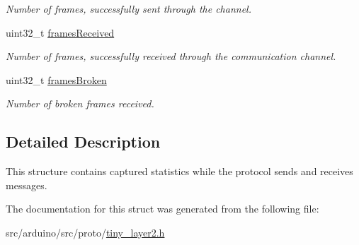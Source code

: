 \begin{DoxyCompactItemize}
\begin{DoxyCompactList}\small\item\em Number of frames, successfully sent through the channel. \end{DoxyCompactList}\item 
\hypertarget{structSTinyStats_a19dfd3a62dbb9d86f6fb77eb1ea6f871}{}uint32\+\_\+t \hyperlink{structSTinyStats_a19dfd3a62dbb9d86f6fb77eb1ea6f871}{frames\+Received}\label{structSTinyStats_a19dfd3a62dbb9d86f6fb77eb1ea6f871}

\begin{DoxyCompactList}\small\item\em Number of frames, successfully received through the communication channel. \end{DoxyCompactList}\item 
\hypertarget{structSTinyStats_abe4f4a9455b532e22f29e60789386130}{}uint32\+\_\+t \hyperlink{structSTinyStats_abe4f4a9455b532e22f29e60789386130}{frames\+Broken}\label{structSTinyStats_abe4f4a9455b532e22f29e60789386130}

\begin{DoxyCompactList}\small\item\em Number of broken frames received. \end{DoxyCompactList}\end{DoxyCompactItemize}


\subsection{Detailed Description}
This structure contains captured statistics while the protocol sends and receives messages. 

The documentation for this struct was generated from the following file\+:\begin{DoxyCompactItemize}
\item 
src/arduino/src/proto/\hyperlink{src_2arduino_2src_2proto_2tiny__layer2_8h}{tiny\+\_\+layer2.\+h}\end{DoxyCompactItemize}
